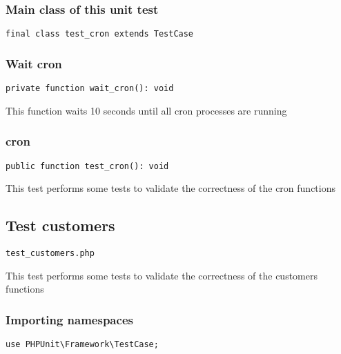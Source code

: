 \documentclass[a4paper]{article}
\begin{document}
\hypertarget{toc109}{}
\subsubsection{Main class of this unit test}

\begin{lstlisting}
final class test_cron extends TestCase
\end{lstlisting}

\hypertarget{toc110}{}
\subsubsection{Wait cron}

\begin{lstlisting}
private function wait_cron(): void
\end{lstlisting}

This function waits 10 seconds until all cron processes are running

\hypertarget{toc111}{}
\subsubsection{cron}

\begin{lstlisting}
public function test_cron(): void
\end{lstlisting}

This test performs some tests to validate the correctness
of the cron functions

\hypertarget{toc112}{}
\subsection{Test customers}

\begin{lstlisting}
test_customers.php
\end{lstlisting}

This test performs some tests to validate the correctness
of the customers functions

\hypertarget{toc113}{}
\subsubsection{Importing namespaces}

\begin{lstlisting}
use PHPUnit\Framework\TestCase;
\end{lstlisting}

\hypertarget{toc114}{}
\end{document}
